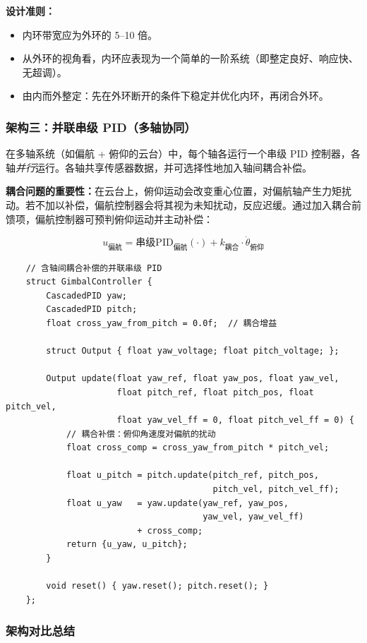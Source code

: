 \textbf{设计准则：}
\begin{itemize}[nosep]
    \item 内环带宽应为外环的 5--10 倍。
    \item 从外环的视角看，内环应表现为一个简单的一阶系统（即整定良好、响应快、无超调）。
    \item 由内而外整定：先在外环断开的条件下稳定并优化内环，再闭合外环。
\end{itemize}

\subsubsection{架构三：并联串级 PID（多轴协同）}

在多轴系统（如偏航 + 俯仰的云台）中，每个轴各运行一个串级 PID 控制器，各轴\textit{并行}运行。各轴共享传感器数据，并可选择性地加入轴间耦合补偿。

\textbf{耦合问题的重要性：}在云台上，俯仰运动会改变重心位置，对偏航轴产生力矩扰动。若不加以补偿，偏航控制器会将其视为未知扰动，反应迟缓。通过加入耦合前馈项，偏航控制器可预判俯仰运动并主动补偿：

\[
u_{\text{偏航}} = \text{串级PID}_{\text{偏航}}(\cdot) + k_{\text{耦合}} \cdot \dot{\theta}_{\text{俯仰}}
\]

\begin{verbatim}
    // 含轴间耦合补偿的并联串级 PID
    struct GimbalController {
        CascadedPID yaw;
        CascadedPID pitch;
        float cross_yaw_from_pitch = 0.0f;  // 耦合增益

        struct Output { float yaw_voltage; float pitch_voltage; };

        Output update(float yaw_ref, float yaw_pos, float yaw_vel,
                      float pitch_ref, float pitch_pos, float pitch_vel,
                      float yaw_vel_ff = 0, float pitch_vel_ff = 0) {
            // 耦合补偿：俯仰角速度对偏航的扰动
            float cross_comp = cross_yaw_from_pitch * pitch_vel;

            float u_pitch = pitch.update(pitch_ref, pitch_pos,
                                         pitch_vel, pitch_vel_ff);
            float u_yaw   = yaw.update(yaw_ref, yaw_pos,
                                       yaw_vel, yaw_vel_ff)
                          + cross_comp;
            return {u_yaw, u_pitch};
        }

        void reset() { yaw.reset(); pitch.reset(); }
    };
\end{verbatim}

\subsubsection{架构对比总结}

